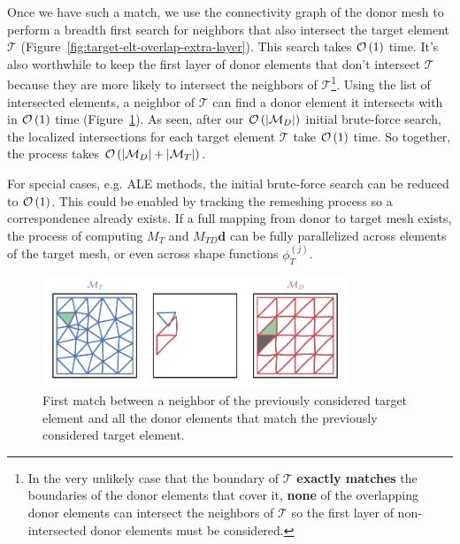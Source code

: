 Once we have such a match, we use the connectivity graph of the
donor mesh to perform a breadth first search
for neighbors that also intersect the target
element \(\mathcal{T}\) (Figure~\ref{fig:target-elt-overlap-extra-layer}).
This search takes \(\mathcal{O}\left(1\right)\) time. It's also worthwhile to keep the first
layer of donor elements that don't intersect \(\mathcal{T}\) because they are
more likely to intersect the neighbors of \(\mathcal{T}\)\footnote{In the
very unlikely case that the boundary of \(\mathcal{T}\)
\textbf{exactly matches} the boundaries of the donor elements that cover it,
\textbf{none} of the overlapping donor elements can intersect the neighbors of
\(\mathcal{T}\) so the first layer of non-intersected donor
elements must be considered.}. Using the list of intersected elements, a
neighbor of \(\mathcal{T}\) can find a donor element it intersects with in
\(\mathcal{O}\left(1\right)\) time (Figure~\ref{fig:target-elt-neighbor}).
As seen, after our \(\mathcal{O}\left(\left|\mathcal{M}_D\right|\right)\)
initial brute-force search, the localized intersections for each
target element \(\mathcal{T}\) take
\(\mathcal{O}\left(1\right)\) time. So together, the process takes
\(\mathcal{O}\left(\left|\mathcal{M}_D\right| + \left|\mathcal{M}_T\right|\right)\).

For special cases, e.g. ALE methods, the initial brute-force search
can be reduced to \(\mathcal{O}\left(1\right)\). This could be enabled by tracking
the remeshing process so a correspondence already exists. If a full
mapping from donor to target mesh exists, the process of computing
\(M_T\) and \(M_{TD} \bm{d}\) can be fully parallelized across
elements of the target mesh, or even across shape functions
\(\phi_T^{(j)}\).

\begin{figure}
  \includegraphics[width=0.8125\textwidth]
                  {../images/curved-mesh/main_figure15.pdf}
  \centering
  \captionsetup{width=.75\linewidth}
  \caption{First match between a neighbor of the previously considered
    target element and all the donor elements that match the
    previously considered target element.}
  \label{fig:target-elt-neighbor}
\end{figure}

